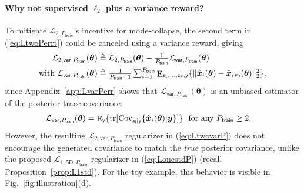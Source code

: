 \documentclass{article}
\theoremstyle{plain}
\theoremstyle{definition}
\theoremstyle{remark}
\newcommand{\defn}{\triangleq}
\newcommand{\ovec}[1]{\boldsymbol{\Bar{#1}}}
\newcommand{\hvec}[1]{\ensuremath{\Hat{\boldsymbol{#1}}}}
\renewcommand{\vec}[1]{\ensuremath{\boldsymbol{#1}}}
\newcommand{\mc}[1]{\ensuremath{\mathcal{#1}}}
\DeclareMathOperator{\E}{E}
\DeclareMathOperator{\Cov}{Cov}
\DeclareMathOperator{\tr}{tr}
\renewcommand{\eqref}[1]{(\ref{eq:#1})}
\newcommand{\figref}[1]{Fig.~\ref{fig:#1}}
\newcommand{\appref}[1]{Appendix~\ref{app:#1}}
\newcommand{\propref}[1]{Proposition~\ref{prop:#1}}
\newcommand{\mmse}{_{\mathsf{mmse}}}
\newcommand{\Ey}{\E_{\mathsf{y}}}
\newcommand{\Exgy}{\E_{\mathsf{x}|\mathsf{y}}}
\newcommand{\Ezigy}{\E_{\mathsf{z_i}|\mathsf{y}}}
\newcommand{\EzPy}{\E_{\mathsf{z_1,...,z_P,y}}}
\newcommand{\Covzigy}{\Cov_{\mathsf{z_i}|\mathsf{y}}}
\newcommand{\train}{_{\mathsf{train}}}
\newcommand{\Ladv}{\mc{L}_{\mathsf{adv}}}
\newcommand{\LtwoPt}{\mc{L}_{2,P\train}}
\newcommand{\LvarPt}{\mc{L}_{\mathsf{var},P\train}}
\newcommand{\LtwovarP}{\mc{L}_{2,\mathsf{var},P}}
\newcommand{\LtwovarPt}{\mc{L}_{2,\mathsf{var},P\train}}
\newcommand{\LonestdPt}{\mc{L}_{1,\mathsf{SD},P\train}}
\newcommand{\betaadv}{\beta_{\mathsf{adv}}}
\newcommand{\betavar}{\beta_{\mathsf{var}}}
\newcommand{\avgP}{_{\scriptscriptstyle (P)}}
\begin{document}
\paragraph{Why not supervised $\ell_2$ plus a variance reward?} 
To mitigate $\LtwoPt$'s incentive for mode-collapse, the second term in \eqref{LtwoPerrt} could be canceled using a variance reward, giving 
\begin{align}
\LtwovarPt(\vec{\theta})
&\defn \textstyle \LtwoPt(\vec{\theta}) - \frac{1}{P\train}\LvarPt(\vec{\theta})
\label{eq:LtwovarP} \\
\text{with~}\LvarPt(\vec{\theta})
&\defn \textstyle \frac{1}{P\train-1}\sum_{i=1}^{P\train} \EzPy\{\|\hvec{x}_i(\vec{\theta})-\hvec{x}\avgP(\vec{\theta})\|_2^2\}
\label{eq:LvarP} .
\end{align}
since \appref{LvarPerr} shows that $\LvarPt(\vec{\theta})$ is an unbiased estimator of the posterior trace-covariance:
\begin{align}
\LvarPt(\vec{\theta})
&= \textstyle \Ey \{ \tr [ \Covzigy\{\hvec{x}_i(\vec{\theta}) | \vec{y}\} ] \}
\text{~~for any~} P\train\geq 2
\label{eq:LvarPerr}.
\end{align}
However, the resulting $\LtwovarPt$ regularizer in \eqref{LtwovarP} does not encourage the generated covariance to match the \emph{true} posterior covariance, unlike the proposed $\LonestdPt$ regularizer in \eqref{LonestdP} (recall \propref{L1std}).
For the toy example, this behavior is visible in \figref{illustration}(d).
\end{document}
